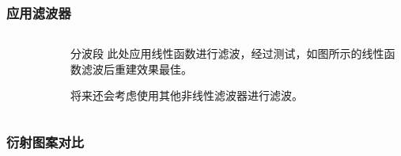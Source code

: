 \documentclass[12pt,aspectratio=169]{beamer} %
\begin{document}
\begin{frame}
    \frametitle{应用滤波器}
        \begin{columns}
            \begin{column}{0.5\textwidth}
                \begin{figure}
                    
                \end{figure} 
            \end{column}
            \begin{column}{0.4\textwidth}
                \begin{block}{分波段}
                    此处应用线性函数进行滤波，经过测试，如图所示的线性函数滤波后重建效果最佳。

                    将来还会考虑使用其他非线性滤波器进行滤波。
                \end{block}
            \end{column}
        \end{columns}
\end{frame}

\begin{frame}
    \frametitle{衍射图案对比}
        \begin{figure}
            \qquad
            \qquad
        \end{figure}
\end{frame}
\end{document}
